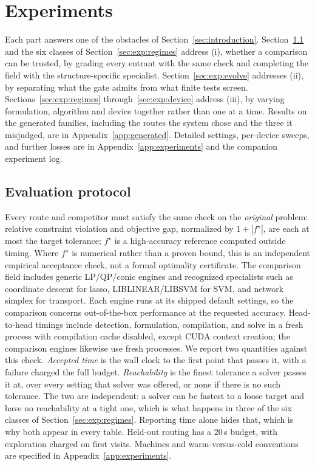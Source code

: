\section{Experiments}
\label{sec:experiments}

Each part answers one of the obstacles of Section~\ref{sec:introduction}.
Section~\ref{sec:exp:protocol} and the six classes of
Section~\ref{sec:exp:regimes} address (i), whether a comparison can be trusted,
by grading every entrant with the same check and completing the field with the
structure-specific specialist. Section~\ref{sec:exp:evolve} addresses (ii), by
separating what the gate admits from what finite tests screen.
Sections~\ref{sec:exp:regimes} through~\ref{sec:exp:device} address (iii), by
varying formulation, algorithm and device together rather than one at a time. Results on the generated families, including the routes the system chose and the three it misjudged, are in Appendix~\ref{app:generated}. Detailed settings, per-device sweeps, and further losses are in Appendix~\ref{app:experiments} and the companion experiment log.

\subsection{Evaluation protocol}
\label{sec:exp:protocol}
Every route and competitor must satisfy the same check on the \emph{original} problem: relative constraint violation and objective gap, normalized by $1+|f^\star|$, are each at most the target tolerance; $f^\star$ is a high-accuracy reference computed outside timing. Where $f^\star$ is numerical rather than a proven bound, this is an independent empirical acceptance check, not a formal optimality certificate. The comparison field includes generic LP/QP/conic engines and recognized specialists such as coordinate descent for lasso, LIBLINEAR/LIBSVM for SVM, and network simplex for transport. Each engine runs at its shipped default settings, so the comparison concerns out-of-the-box performance at the requested accuracy. Head-to-head timings include detection, formulation, compilation, and solve in a fresh process with compilation cache disabled, except CUDA context creation; the comparison engines likewise use fresh processes. We report two quantities against this check. \emph{Accepted time} is the wall
clock to the first point that passes it, with a failure charged the full budget.
\emph{Reachability} is the finest tolerance a solver passes it at, over every
setting that solver was offered, or none if there is no such tolerance. The two
are independent: a solver can be fastest to a loose target and have no
reachability at a tight one, which is what happens in three of the six classes
of Section~\ref{sec:exp:regimes}. Reporting time alone hides that, which is why
both appear in every table.
Held-out routing has a 20\,s budget, with exploration charged on first visits. Machines and warm-versus-cold conventions are specified in Appendix~\ref{app:experiments}.

